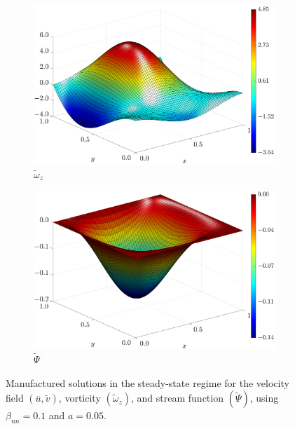 \documentclass[preprint, 12pt]{elsarticle}
\begin{document}
\begin{figure}[H]
\begin{subfigure}[b]{.46\textwidth}
        \includegraphics[width=\textwidth]{Exact_Surf_NormErr_2nd_Betann_0.1_Re_1_Wi_1_epsilon_0_xi_0_alphaG_0_Dt_1e-06_at_0.05_tipsim_1_MMS_12_Wz.eps}
        \caption{$\widetilde{\omega}_{z}$\label{fig:solexawzCase1}}
    \end{subfigure}
    \vspace{0.2cm}
    \begin{subfigure}[b]{.46\textwidth}
        \includegraphics[width=\textwidth]{Exact_Surf_NormErr_2nd_Betann_0.1_Re_1_Wi_1_epsilon_0_xi_0_alphaG_0_Dt_1e-06_at_0.05_tipsim_1_MMS_12_Psi.eps}
        \caption{$\widetilde{\Psi}$\label{fig:solexapsiCase1}}
    \end{subfigure}
    \vspace{0.02cm}
    \caption{Manufactured solutions in the steady-state regime for the velocity field $(\overline{u},\widetilde{v})$, vorticity $(\widetilde{\omega}_{z})$, and stream function $(\widetilde{\Psi})$, using $\beta_{nn}=0.1$ and $a = 0.05$.\label{U_m_u_sol_num_case1map2}}
\end{figure}
\end{document}
